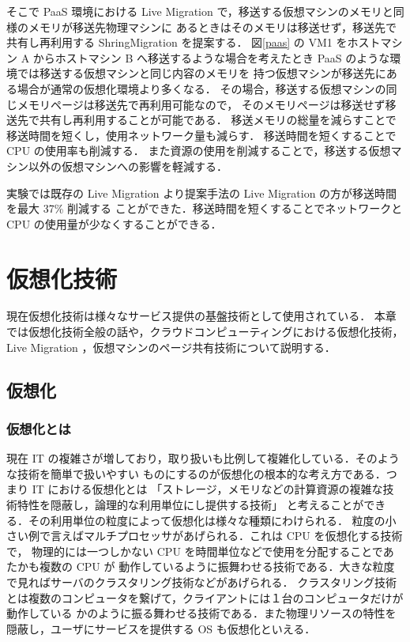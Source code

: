 \documentclass[graduation-thesis]{mlarticle}
\begin{document}
そこで PaaS 環境における Live Migration で，移送する仮想マシンのメモリと同様のメモリが移送先物理マシンに
あるときはそのメモリは移送せず，移送先で共有し再利用する ShringMigration を提案する．
図\ref{paas} の VM1 をホストマシン A からホストマシン B へ移送するような場合を考えたとき
PaaS のような環境では移送する仮想マシンと同じ内容のメモリを
持つ仮想マシンが移送先にある場合が通常の仮想化環境より多くなる．
その場合，移送する仮想マシンの同じメモリページは移送先で再利用可能なので，
そのメモリページは移送せず移送先で共有し再利用することが可能である．
移送メモリの総量を減らすことで移送時間を短くし，使用ネットワーク量も減らす．
移送時間を短くすることで CPU の使用率も削減する．
また資源の使用を削減することで，移送する仮想マシン以外の仮想マシンへの影響を軽減する．

実験では既存の Live Migration より提案手法の Live Migration の方が移送時間を最大 37\% 削減する
ことができた．移送時間を短くすることでネットワークと CPU の使用量が少なくすることができる．

\clearpage
\section{仮想化技術}
\label{sec-2}
現在仮想化技術は様々なサービス提供の基盤技術として使用されている．
本章では仮想化技術全般の話や，クラウドコンピューティングにおける仮想化技術，
Live Migration ，仮想マシンのページ共有技術について説明する．
\subsection{仮想化}
\label{sec-2-1}
\subsubsection{仮想化とは}
\label{sec-2-1-1}
現在 IT の複雑さが増しており，取り扱いも比例して複雑化している．そのような技術を簡単で扱いやすい
ものにするのが仮想化の根本的な考え方である．つまり IT における仮想化とは
「ストレージ，メモリなどの計算資源の複雑な技術特性を隠蔽し，論理的な利用単位にし提供する技術」
と考えることができる．その利用単位の粒度によって仮想化は様々な種類にわけられる．
粒度の小さい例で言えばマルチプロセッサがあげられる．これは CPU を仮想化する技術で，
物理的には一つしかない CPU を時間単位などで使用を分配することであたかも複数の CPU が
動作しているように振舞わせる技術である．大きな粒度で見ればサーバのクラスタリング技術などがあげられる．
クラスタリング技術とは複数のコンピュータを繋げて，クライアントには１台のコンピュータだけが動作している
かのように振る舞わせる技術である．また物理リソースの特性を隠蔽し，ユーザにサービスを提供する
OS も仮想化といえる．
\end{document}
